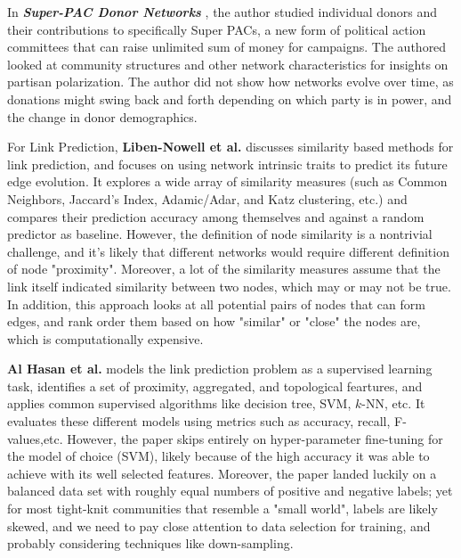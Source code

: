\documentclass[12pt,twocolumn]{article}
\begin{document}
In \textbf{\textit{Super-PAC Donor Networks}} \cite{moody_2015}, the author studied individual donors and their contributions to specifically Super PACs, a new form of political action committees that can raise unlimited sum of money for campaigns. The authored looked at community structures and other network characteristics for insights on partisan polarization. The author did not show how networks evolve over time, as donations might swing back and forth depending on which party is in power, and the change in donor demographics. 

For Link Prediction, \textbf{Liben-Nowell et al.} \cite{liben2007link} discusses similarity based methods for link prediction, and focuses on using network intrinsic traits to predict its future edge evolution. It explores a wide array of similarity measures (such as Common Neighbors, Jaccard's Index, Adamic/Adar, and Katz clustering, etc.) and compares their prediction accuracy among themselves and against a random predictor as baseline. However, the definition of node similarity is a nontrivial challenge, and it's likely that different networks would require different definition of node "proximity". Moreover, a lot of the similarity measures assume that the link itself indicated similarity between two nodes, which may or may not be true. In addition, this approach looks at all potential pairs of nodes that can form edges, and rank order them based on how "similar" or "close" the nodes are, which is computationally expensive. 

\textbf{Al Hasan et al.} \cite{al2006link} models the link prediction problem as a supervised learning task, identifies a set of proximity, aggregated, and topological feartures, and applies common supervised algorithms like decision tree, SVM, $k$-NN, etc. It evaluates these different models using metrics such as accuracy, recall, F-values,etc. However, the paper skips entirely on hyper-parameter fine-tuning for the model of choice (SVM), likely because of the high accuracy it was able to achieve with its well selected features. Moreover, the paper landed luckily on a balanced data set with roughly equal numbers of positive and negative labels; yet for most tight-knit communities that resemble a "small world", labels are likely skewed, and we need to pay close attention to data selection for training, and probably considering techniques like down-sampling. 
\end{document}
